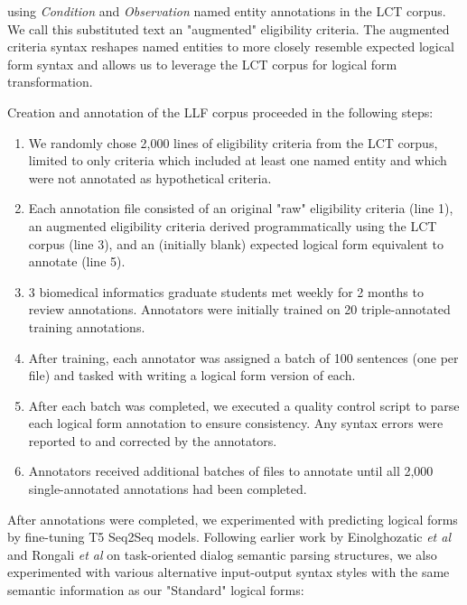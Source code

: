 \documentclass[../main.tex]{subfiles}
\begin{document}
\noindent using \textit{Condition} and \textit{Observation} named entity annotations in the LCT corpus. We call this substituted text an "augmented" eligibility criteria. The augmented criteria syntax reshapes named entities to more closely resemble expected logical form syntax and allows us to leverage the LCT corpus for logical form transformation.

Creation and annotation of the LLF corpus proceeded in the following steps:

\begin{enumerate}
    \item We randomly chose 2,000 lines of eligibility criteria from the LCT corpus, limited to only criteria which included at least one named entity and which were not annotated as hypothetical criteria.
    \item  Each annotation file consisted of an original "raw" eligibility criteria (line 1), an augmented eligibility criteria derived programmatically using the LCT corpus (line 3), and an (initially blank) expected logical form equivalent to annotate (line 5).
    \item 3 biomedical informatics graduate students met weekly for 2 months to review annotations. Annotators were initially trained on 20 triple-annotated training annotations. 
    \item After training, each annotator was assigned a batch of 100 sentences (one per file) and tasked with writing a logical form version of each.
    \item After each batch was completed, we executed a quality control script to parse each logical form annotation to ensure consistency. Any syntax errors were reported to and corrected by the annotators.
    \item Annotators received additional batches of files to annotate until all 2,000 single-annotated annotations had been completed.
\end{enumerate}

After annotations were completed, we experimented with predicting logical forms by fine-tuning T5 \cite{raffel2020exploring} Seq2Seq models. Following earlier work by Einolghozatic \textit{et al} \cite{einolghozati2019improving} and Rongali \textit{et al} \cite{rongali2020don} on task-oriented dialog semantic parsing structures, we also experimented with various alternative input-output syntax styles with the same semantic information as our "Standard" logical forms:
\end{document}
